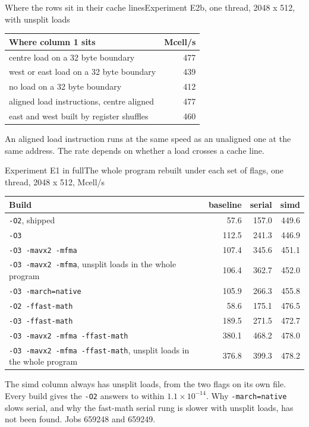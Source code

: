 \documentclass[aspectratio=169,11pt]{beamer}
\newcommand{\sigtable}[3]{%
  \begingroup
  \renewcommand{\arraystretch}{1.12}%
  \begin{table}\small
    \begin{tabular}{#1}
      \toprule
      #2 \\
      \midrule
      #3
      \bottomrule
    \end{tabular}
  \end{table}%
  \endgroup
}
\begin{document}
\begin{frame}{Where the rows sit in their cache lines}{Experiment E2b, one thread, 2048 x 512, with unsplit loads}
  \sigtable{lr}{\textbf{Where column 1 sits} & \textbf{Mcell/s}}{%
    centre load on a 32 byte boundary & 477 \\
    west or east load on a 32 byte boundary & 439 \\
    no load on a 32 byte boundary & 412 \\
    aligned load instructions, centre aligned & 477 \\
    east and west built by register shuffles & 460 \\}
  {\small An aligned load instruction runs at the same speed as an unaligned
  one at the same address. The rate depends on whether a load crosses a
  cache line.}
\end{frame}

\begin{frame}{Experiment E1 in full}{The whole program rebuilt under each set of flags, one thread, 2048 x 512, Mcell/s}
  {\footnotesize
  \renewcommand{\arraystretch}{1.05}
  \begin{tabularx}{\linewidth}{@{}X rrr@{}}
    \toprule
    \textbf{Build} & \textbf{baseline} & \textbf{serial} & \textbf{simd} \\
    \midrule
    \texttt{-O2}, shipped & 57.6 & 157.0 & 449.6 \\
    \texttt{-O3} & 112.5 & 241.3 & 446.9 \\
    \texttt{-O3 -mavx2 -mfma} & 107.4 & 345.6 & 451.1 \\
    \texttt{-O3 -mavx2 -mfma}, unsplit loads in the whole program & 106.4 & 362.7 & 452.0 \\
    \texttt{-O3 -march=native} & 105.9 & 266.3 & 455.8 \\
    \texttt{-O2 -ffast-math} & 58.6 & 175.1 & 476.5 \\
    \texttt{-O3 -ffast-math} & 189.5 & 271.5 & 472.7 \\
    \texttt{-O3 -mavx2 -mfma -ffast-math} & 380.1 & 468.2 & 478.0 \\
    \texttt{-O3 -mavx2 -mfma -ffast-math}, unsplit loads in the whole program & 376.8 & 399.3 & 478.2 \\
    \bottomrule
  \end{tabularx}}
  \par\smallskip
  {\footnotesize The simd column always has unsplit loads, from the two flags
  on its own file. Every build gives the \texttt{-O2} answers to within
  $1.1 \times 10^{-14}$. Why \texttt{-march=native} slows serial, and why
  the fast-math serial rung is slower with unsplit loads, has not been found.
  Jobs 659248 and 659249.}
\end{frame}
\end{document}
